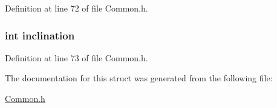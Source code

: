 Definition at line 72 of file Common.\+h.

\hypertarget{struct_direction_af308b9934394c8bcf7614eb1df2d863f}{
\subsubsection[{inclination}]{\setlength{\rightskip}{0pt plus 5cm}int inclination}}\label{struct_direction_af308b9934394c8bcf7614eb1df2d863f}


Definition at line 73 of file Common.\+h.



The documentation for this struct was generated from the following file\+:\begin{DoxyCompactItemize}
\item 
\hyperlink{_common_8h}{Common.\+h}\end{DoxyCompactItemize}
